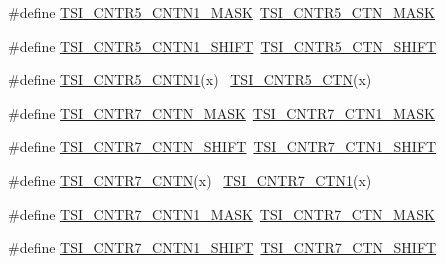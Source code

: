 \begin{DoxyCompactItemize}
\item 
\#define \hyperlink{group___backward___compatibility___symbols_gafb50474805b344bcf1e2331694c6a180}{T\+S\+I\+\_\+\+C\+N\+T\+R5\+\_\+\+C\+N\+T\+N1\+\_\+\+M\+A\+SK}~\hyperlink{group___t_s_i___register___masks_gae1a4f3201c87c0064e434db5a57974a5}{T\+S\+I\+\_\+\+C\+N\+T\+R5\+\_\+\+C\+T\+N\+\_\+\+M\+A\+SK}
\item 
\#define \hyperlink{group___backward___compatibility___symbols_ga4761dce80127c510ed68a97ff6e97064}{T\+S\+I\+\_\+\+C\+N\+T\+R5\+\_\+\+C\+N\+T\+N1\+\_\+\+S\+H\+I\+FT}~\hyperlink{group___t_s_i___register___masks_ga2de11a65c7ac3cdaa665a69652b26638}{T\+S\+I\+\_\+\+C\+N\+T\+R5\+\_\+\+C\+T\+N\+\_\+\+S\+H\+I\+FT}
\item 
\#define \hyperlink{group___backward___compatibility___symbols_gaf9e0ac863678f8cc6dd506b7df5d1ecf}{T\+S\+I\+\_\+\+C\+N\+T\+R5\+\_\+\+C\+N\+T\+N1}(x)                                          ~\hyperlink{group___t_s_i___register___masks_gae9d2366ee549d24dd790fc999fe7b1bf}{T\+S\+I\+\_\+\+C\+N\+T\+R5\+\_\+\+C\+TN}(x)
\item 
\#define \hyperlink{group___backward___compatibility___symbols_ga9e85300eb5e475c8ebd381c36b5da451}{T\+S\+I\+\_\+\+C\+N\+T\+R7\+\_\+\+C\+N\+T\+N\+\_\+\+M\+A\+SK}~\hyperlink{group___t_s_i___register___masks_ga9c4634bb590facebde26807fec2d1d3e}{T\+S\+I\+\_\+\+C\+N\+T\+R7\+\_\+\+C\+T\+N1\+\_\+\+M\+A\+SK}
\item 
\#define \hyperlink{group___backward___compatibility___symbols_ga3be46fa64186d37f59442a85436ca544}{T\+S\+I\+\_\+\+C\+N\+T\+R7\+\_\+\+C\+N\+T\+N\+\_\+\+S\+H\+I\+FT}~\hyperlink{group___t_s_i___register___masks_ga309db3212bb128582d3368796ed78ca7}{T\+S\+I\+\_\+\+C\+N\+T\+R7\+\_\+\+C\+T\+N1\+\_\+\+S\+H\+I\+FT}
\item 
\#define \hyperlink{group___backward___compatibility___symbols_gab6e7d7e2533b162f89779d3f48230816}{T\+S\+I\+\_\+\+C\+N\+T\+R7\+\_\+\+C\+N\+TN}(x)                                            ~\hyperlink{group___t_s_i___register___masks_ga23e75e19bdb0b0984d30f04bf92f667c}{T\+S\+I\+\_\+\+C\+N\+T\+R7\+\_\+\+C\+T\+N1}(x)
\item 
\#define \hyperlink{group___backward___compatibility___symbols_ga00c6721bc33de4446dd92d78b1cf8931}{T\+S\+I\+\_\+\+C\+N\+T\+R7\+\_\+\+C\+N\+T\+N1\+\_\+\+M\+A\+SK}~\hyperlink{group___t_s_i___register___masks_ga7c33a7d7230526987b061c3213315f8f}{T\+S\+I\+\_\+\+C\+N\+T\+R7\+\_\+\+C\+T\+N\+\_\+\+M\+A\+SK}
\item 
\#define \hyperlink{group___backward___compatibility___symbols_gaeabebb89e6f4cba3e9cb85dcda2a2d8d}{T\+S\+I\+\_\+\+C\+N\+T\+R7\+\_\+\+C\+N\+T\+N1\+\_\+\+S\+H\+I\+FT}~\hyperlink{group___t_s_i___register___masks_ga3601612f76d15ea71289beb7dc2c5336}{T\+S\+I\+\_\+\+C\+N\+T\+R7\+\_\+\+C\+T\+N\+\_\+\+S\+H\+I\+FT}

\end{DoxyCompactItemize}
